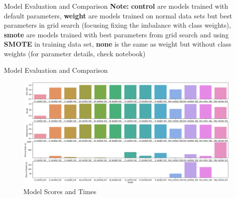 \begin{frame}{Model Evaluation and Comparison}
    \textbf{Note:} \textbf{control} are models trained with default parameters, \textbf{weight} are models trained on normal data sets but best parameters in grid search (focusing fixing the imbalance with class weights), \textbf{smote} are models trained with best parameters from grid search and using \textbf{SMOTE} in training data set, \textbf{none} is the same as weight but without class weights (for parameter details, check notebook)
\end{frame}

\begin{frame}{Model Evaluation and Comparison}


\begin{figure}
    \centering
    \includegraphics[width=.85\textwidth]{images/plots.png}
    \caption{Model Scores and Times}
    \label{fig:my_label}
\end{figure}
\end{frame}